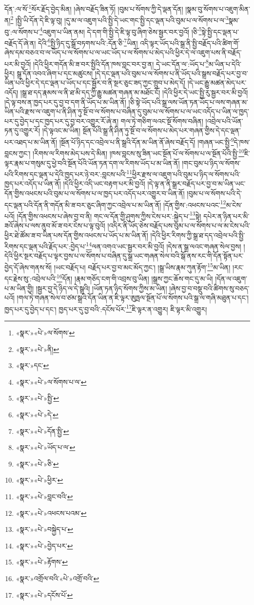 དོན་:ལ་སོ་\footnote{«སྣར་»«པེ་»ལ་སོགས་}སོར་རྗོད་བྱེད་མིན། །ཞེས་བརྗོད་ཟིན་ཏོ། །བུམ་པ་སོགས་ཀྱི་དེ་ལྡན་དོན། །སྣམ་བུ་སོགས་པ་འཇུག་མིན་ན།\footnote{«སྣར་»«པེ་»ནི།} །སྤྱི་ཡི་དོན་དེ་ཇི་ལྟ་བུ། །དུ་མ་ལ་འཇུག་པའི་སྤྱི་དེ་ཡང་གང་སྤྱི་དང་ལྡན་པའི་བུམ་པ་ལ་སོགས་པ་ལ་\footnote{«སྣར་»དང་}སྣམ་བུ་:ལ་སོགས་པ་\footnote{«སྣར་»«པེ་»ལ་སོགས་པ་ལ་}འཇུག་པ་ཡིན་ནམ། དེ་དག་གི་སྤྱི་དེ་ཇི་ལྟ་བུ་ཞིག་ཅེས་སྦྱར་བར་བྱའོ། །ཅི་\footnote{«སྣར་»«པེ་»སྤྱི་}སྟེ་སྤྱི་དང་ལྡན་པ་བརྗོད་དོ་ཞེ་ན། དེའི་\footnote{«སྣར་»«པེ་»དེ་}སྤྱི་ཉིད་དུ་སྒྲོ་བཏགས་པའི་:དོན་ཅི་\footnote{«སྣར་»«པེ་»དོན་སྤྱི་}ཡིན། འདི་ལྟར་ཡོད་པའི་སྒྲ་ནི་སྤྱི་བརྗོད་པའི་ཚིག་གོ་ཞེས་དམ་བཅའ་བ་ལ་ཡོད་པ་ལ་སོགས་པ་ལ་ཡང་ཡོད་པ་ལ་སོགས་པ་མེད་པའི་ཕྱིར་དེ་ལ་འཇུག་པས་ནི་བརྗོད་པར་མི་བྱའོ། །དེའི་ཕྱིར་གདོན་མི་ཟ་བར་སྤྱིའི་དོན་ཁས་བླང་བར་བྱ་ན། དེ་ཡང་དོན་ལ་:ཡོད་པ་\footnote{«སྣར་»«པེ་»ཡོད་པ་ལ་}མ་ཡིན་པ་དེའི་ཕྱིར། སྒྲ་དོན་འབའ་ཞིག་པ་དང་མཚུངས། །དེ་དང་ལྡན་པའི་བུམ་པ་ལ་སོགས་པ་ནི་ཡོད་པའི་སྒྲས་བརྗོད་པར་བྱ་བ་ཡིན་པའི་ཕྱིར་དེ་དང་ལྡན་པ་ཡོད་པ་དང་སྦྱོར་བ་ནི་སྔར་ཅུང་ཟད་ཀྱང་གྲུབ་པ་མེད་དོ། །དེ་ཡང་རྒྱུ་མཚན་མེད་པར་འདོད། །སྒྲ་ཐ་དད་རྣམས་ལ་ནི་ཐ་མི་དད་ཀྱི་རྒྱུ་མཚན་གཞན་མ་མཐོང་ངོ། །དེའི་ཕྱིར་དེ་ཡང་སྤྱི་རུ་སྦྱར་བར་མི་བྱའོ། །དེ་ལྟ་བས་ན་ཁྱད་པར་དུ་བྱ་བ་དག་ནི་ཡོད་པ་མ་ཡིན་ནོ། །ཅི་སྟེ་ཡོད་པའི་སྒྲ་ལས་ཡོན་ཏན་ཡོད་པ་ལས་གཞན་མ་ཡིན་པའི་རྫས་ལ་འཇུག་པ་ནི་ཤིན་ཏུ་སྔོ་བ་ལ་སོགས་པ་བཞིན་དུ་བུམ་པ་ལ་སོགས་པ་ལ་ཡང་འདོད་པ་ཡིན་ལ་ཁྱད་པར་དུ་བྱེད་པ་དང་ཁྱད་པར་དུ་བྱ་བར་འགྱུར་རོ་ཞེ་ན། གལ་ཏེ་གཅིག་ལའང་སྔོ་སོགས་བཞིན། །འབྲེལ་པའི་ཡོན་ཏན་དུ་འགྱུར་རོ། །དེ་ལྟའང་མ་ཡིན། སྔོན་པོའི་སྒྲ་ནི་ཤིན་ཏུ་སྔོ་བ་ལ་སོགས་པ་མེད་པར་གཞན་གྱིས་དེ་དང་ལྡན་པར་འཐད་པ་མ་ཡིན་ནོ། །སྔོན་པོ་ཉིད་དང་འབྲེལ་པ་ནི་སྒྲའི་དོན་མ་ཡིན་ནོ་ཞེས་བརྗོད་དོ། །གཞན་ཡང་སྤྱི་\footnote{«སྣར་»«པེ་»ཅི་}དེ་ཁས་བླངས་ཀྱང་། །རིགས་ལ་རིགས་མེད་པས་དེ་མིན། །ཁས་བླངས་སུ་ཟིན་ཡང་སྔོན་པོ་ལ་སོགས་པ་ལ་སྔོན་པོའི་སྤྱི་\footnote{«སྣར་»«པེ་»ཕྱིར་}ཇི་ལྟར་རྣམ་པ་གསུམ་དུ་ཕྱེ་བའི་སྔོན་པོའི་ཡོན་ཏན་དག་ལ་རིགས་ཡོད་པ་མ་ཡིན་ནོ། །གང་བུམ་པ་ཉིད་ལ་སོགས་པའི་རིགས་དང་ལྡན་པ་དེའི་ཁྱད་པར་ཉེ་བར་:བླངས་པའི་\footnote{«སྣར་»«པེ་»བླང་བའི་}ཕྱིར་རྫས་ལ་འཇུག་པའི་བུམ་པ་ཉིད་ལ་སོགས་པའི་ཁྱད་པར་འདོད་པ་ཡིན་ནོ། །དེའི་ཕྱིར་འདི་ཡང་བརྟག་པར་མི་བྱའོ། །དེ་ལྟ་ན་ནི་སྒྲར་བརྗོད་པར་བྱ་བ་མ་ཡིན་ཡང་དོན་གྱིས་འཕངས་པའི་བུམ་པ་ལ་སོགས་པ་ལ་ཁྱད་པར་འདོད་པར་འགྱུར་བ་ཡིན་ནོ། །བུམ་པ་ལ་སོགས་པའི་དེ་དང་ལྡན་པའི་དོན་ནི་གདོན་མི་ཟ་བར་ཅུང་ཞིག་ཀྱང་འབྲེལ་པ་མ་ཡིན་ནོ། །དོན་གྱིས་:འཕངས་པའང་\footnote{«སྣར་»«པེ་»འཕངས་པའམ་}མ་ངེས་པའོ། །དོན་གྱིས་འཕངས་པ་ཞེས་བྱ་བ་ནི། གང་ལ་དོན་གྱི་ཤུགས་ཀྱིས་ངེས་པར་:སྐྱེད་པ་\footnote{«སྣར་»«པེ་»བསྐྱེད་པ་}སྟེ། དཔེར་ན་ཉིན་པར་མི་ཟའོ་ཞེས་པ་ལས་ནུབ་མོ་ཟ་བར་ངེས་པ་ལྟ་བུའོ། །འདིར་ནི་ཡོད་ཅེས་བརྗོད་པས་བུམ་པ་ལ་སོགས་པ་ལ་མ་ངེས་པའི་ཕྱིར་ཐེ་ཚོམ་ཟ་བ་ཡིན་པས་དོན་གྱིས་འཕངས་པ་ཡོད་པ་མ་ཡིན་ནོ། །དེའི་ཕྱིར་རིགས་ཀྱི་སྒྲ་ཐ་དད་འབྲེལ་པའི་སྤྱི་རིགས་དང་ལྡན་པའི་རྗོད་པར་:བྱེད་པ་\footnote{«སྣར་»«པེ་»བྱེད་པར་}ལན་འགའ་ཡང་སྦྱར་བར་མི་བྱའོ། །དེས་ན་སྒྲ་ལའང་གཞན་སེལ་བྱས། །དེའི་ཕྱིར་སྔར་བརྗོད་པ་ལྟར་བྱས་པ་ལ་སོགས་པ་བཞིན་དུ་སྒྲ་ཡང་གཞན་སེལ་བའི་སྒོ་ནས་རང་གི་དོན་སྟོན་པར་བྱེད་དོ་ཞེས་གནས་སོ། །ཡང་བརྗོད་པ། བརྗོད་པར་བྱ་བ་མང་མོད་ཀྱང་། །སྒྲ་ཡིས་རྣམ་ཀུན་རྟོག་\footnote{«སྣར་»«པེ་»རྟོགས་}མ་ཡིན། །རང་དང་རྗེས་སུ་:འབྲེལ་པའི་\footnote{«སྣར་»འགྲོལ་བའི་«པེ་»འགྲོ་བའི་}དོན། །རྣམ་གཅོད་ངག་གི་འབྲས་བུ་ཡིན། །སྒྲས་ཀྱང་ཆོས་གང་དུ་མ་ཡི། །དོན་ལ་འཇུག་པ་མ་ཡིན་གྱི། །སྦྱར་བྱ་དེ་ཉིད་ལ་དེ་སྒྲའི། །ཡོན་ཏན་ཉིད་སོགས་ཀྱིས་མ་ཡིན། །ཞེས་བྱ་བ་བསྡུ་བའི་ཚིགས་སུ་བཅད་པའོ། །གལ་ཏེ་གཞན་སེལ་བ་ཙམ་སྒྲའི་དོན་ཡིན་ན་ཇི་ལྟར་ཨུཏྤལ་སྔོན་པོ་ལ་སོགས་པའི་སྒྲ་ལ་གཞི་མཐུན་པ་དང་། ཁྱད་པར་དུ་བྱེད་པ་དང་། ཁྱད་པར་དུ་བྱ་བའི་:དངོས་པོར་\footnote{«སྣར་»«པེ་»དངོས་པོ་}ཇི་ལྟར་ན་འགྱུར། ཇི་ལྟར་མི་འགྱུར། 